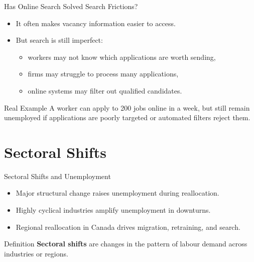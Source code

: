 \documentclass[aspectratio=169]{beamer}
\begin{document}
\begin{frame}{Has Online Search Solved Search Frictions?}
\transfade
\begin{itemize}
  \item It often makes vacancy information easier to access.
  \item But search is still imperfect:
  \begin{itemize}
    \item workers may not know which applications are worth sending,
    \item firms may struggle to process many applications,
    \item online systems may filter out qualified candidates.
  \end{itemize}
\end{itemize}

\begin{exampleblock}{Real Example}
A worker can apply to 200 jobs online in a week, but still remain unemployed if applications are poorly targeted or automated filters reject them.
\end{exampleblock}
\end{frame}

\section{Sectoral Shifts}

\begin{frame}{Sectoral Shifts and Unemployment}
\transfade
\begin{itemize}
  \item Major structural change raises unemployment during reallocation.
  \item Highly cyclical industries amplify unemployment in downturns.
  \item Regional reallocation in Canada drives migration, retraining, and search.
\end{itemize}

\begin{block}{Definition}
\textbf{Sectoral shifts} are changes in the pattern of labour demand across industries or regions.
\end{block}
\end{frame}
\end{document}
